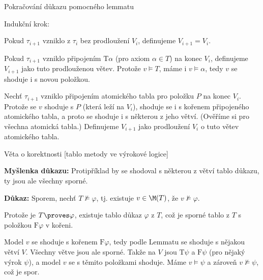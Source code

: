 \documentclass{beamer}
\begin{document}
\begin{frame}{Pokračování důkazu pomocného lemmatu}

    \alert{Indukční krok:}
    
    \pause
    Pokud $\tau_{i+1}$ vzniklo z $\tau_i$ bez prodloužení $V_i$, definujeme $V_{i+1}=V_i$.

    \medskip

    \pause
    Pokud $\tau_{i+1}$ vzniklo připojením $\mathrm{T}\alpha$ (pro axiom $\alpha\in T$) na konec $V_i$, definujeme $V_{i+1}$ jako tuto prodlouženou větev. \pause
    Protože $v\models T$, máme i $v\models\alpha$, tedy $v$ se shoduje i s novou položkou.
    
    \medskip

    \pause
    Nechť $\tau_{i+1}$ vzniklo připojením atomického tabla pro položku $P$ na konec $V_i$. \pause
    Protože se $v$ shoduje s $P$ (která leží na $V_i$), shoduje se i s kořenem připojeného atomického tabla, a proto se shoduje i s některou z jeho větví. \pause
    (Ověříme si pro všechna atomická tabla.) \pause
    Definujeme $V_{i+1}$ jako prodloužení $V_i$ o tuto větev atomického tabla.\hfill\qedsymbol

\end{frame}


\begin{frame}{Věta o korektnosti [tablo metody ve výrokové logice]}


    \medskip

    \pause
    \textbf{Myšlenka důkazu:} Protipříklad by se shodoval s některou z větví tablo důkazu, ty jsou ale všechny sporné.

    \medskip

    \pause
    \textbf{Důkaz:} Sporem, nechť $T\not\models\varphi$, tj. existuje $v\in\M(T)$, že $v\not\models\varphi$.
     
    \pause
    Protože je $T\proves\varphi$, existuje tablo důkaz $\varphi$ z $T$, což je sporné tablo z $T$ s položkou $\mathrm{F}\varphi$ v kořeni. 
    
    \pause
    Model $v$ se shoduje s kořenem $\mathrm{F}\varphi$, tedy podle Lemmatu se shoduje s nějakou větví $V$. \pause
    Všechny větve jsou ale sporné. \pause
     Takže na $V$ jsou $\mathrm{T}\psi$ a $\mathrm{F}\psi$ (pro nějaký výrok $\psi$), a model $v$ se s těmito položkami shoduje. \pause
     Máme $v\models\psi$ a zároveň $v\not\models\psi$, což je spor.\hfill\qedsymbol

\end{frame}
\end{document}
